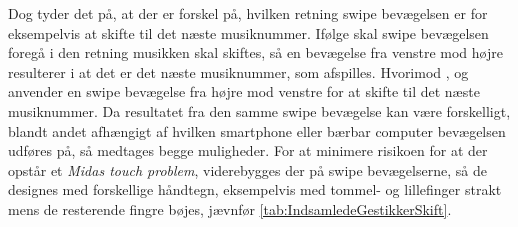 Dog tyder det på, at der er forskel på, hvilken retning swipe bevægelsen er for eksempelvis at skifte til det næste musiknummer. Ifølge \textcite[s. 166]{PDF:ComparingInputModalities} skal swipe bevægelsen foregå i den retning musikken skal skiftes, så en bevægelse fra venstre mod højre resulterer i at det er det næste musiknummer, som afspilles. Hvorimod \textcite[s. 48]{PDF:UserDefinedGesturesTV}, \textcite{WEB:Beosound2} og \textcite{WEB:BeosoundMoment} anvender en swipe bevægelse fra højre mod venstre for at skifte til det næste musiknummer. Da resultatet fra den samme swipe bevægelse kan være forskelligt, blandt andet afhængigt af hvilken smartphone eller bærbar computer bevægelsen udføres på, så medtages begge muligheder. For at minimere risikoen for at der opstår et \textit{Midas touch problem}, viderebygges der på swipe bevægelserne, så de designes med forskellige håndtegn, eksempelvis med tommel- og lillefinger strakt mens de resterende fingre bøjes, jævnfør \autoref{tab:IndsamledeGestikkerSkift}.

